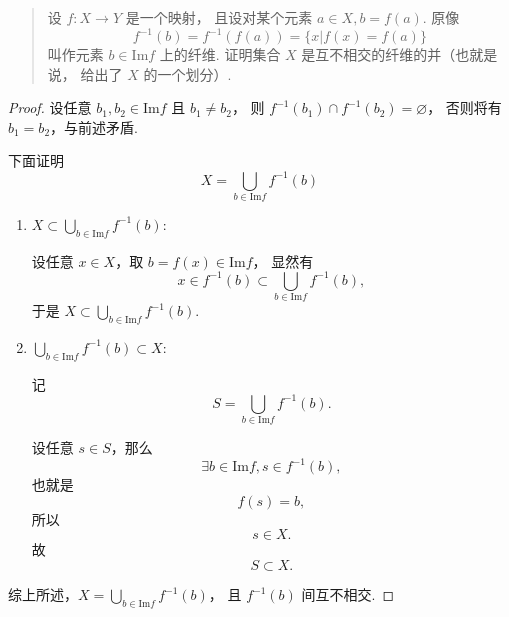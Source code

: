 \begin{quotation}
    设 $f: X \to Y$ 是一个映射，
    且设对某个元素 $a \in X, b = f(a)$.
    原像
    \[
        f^{-1}(b) = f^{-1}(f(a)) = \{ x \vert f(x) = f(a) \}
    \]
    叫作元素 $b \in \mathrm{Im}f$ 上的纤维.
    证明集合 $X$ 是互不相交的纤维的并（也就是说，
    给出了 $X$ 的一个划分）.
\end{quotation}
\begin{proof}
    设任意 $b_1, b_2 \in \mathrm{Im}f$ 且 $b_1 \ne b_2$，
    则 $f^{-1}(b_1) \cap f^{-1}(b_2) = \varnothing$，
    否则将有 $b_1 = b_2$，与前述矛盾.

    下面证明
    \begin{equation*}
        X = \bigcup_{b \in \mathrm{Im}f}{f^{-1}(b)}
    \end{equation*}

    \begin{enumerate}
        \item $X \subset \bigcup_{b \in \mathrm{Im}f}{f^{-1}(b)}$:

            设任意 $x \in X$，取 $b = f(x) \in \mathrm{Im}f$，
            显然有
            \begin{equation}
                x \in f^{-1}(b) \subset \bigcup_{b \in \mathrm{Im}f}{f^{-1}(b)},
            \end{equation}
            于是 $X \subset \bigcup_{b \in \mathrm{Im}f}{f^{-1}(b)}$.

        \item $\bigcup_{b \in \mathrm{Im}f}{f^{-1}(b)} \subset X$:

            记
            \begin{equation}
                S = \bigcup_{b \in \mathrm{Im}f}{f^{-1}(b)}.
            \end{equation}

            设任意 $s \in S$，那么
            \begin{equation}
                \exists b \in \mathrm{Im}f, s \in f^{-1}(b),
            \end{equation}
            也就是
            \begin{equation}
                f(s) = b,
            \end{equation}
            所以
            \begin{equation}
                s \in X.
            \end{equation}
            故
            \begin{equation}
                S \subset X.
            \end{equation}
    \end{enumerate}

    综上所述，$X = \bigcup_{b \in \mathrm{Im}f}{f^{-1}(b)}$，
    且 $f^{-1}(b)$ 间互不相交.
\end{proof}

